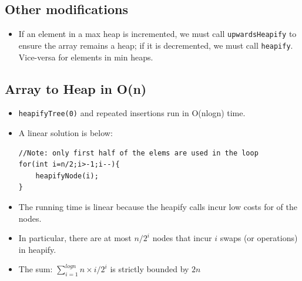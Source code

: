 \documentclass{report}
\begin{document}
\subsection{Other modifications}
\begin{itemize}
\item If an element in a max heap is incremented, we must call \texttt{upwardsHeapify} to ensure the array remains a heap; if it is decremented, we must call \texttt{heapify}. Vice-versa for elements in min heaps. 
\end{itemize}
\subsection{Array to Heap in O(n)}
\begin{itemize}
\item \texttt{heapifyTree(0)} and repeated insertions run in O(nlogn) time.
\item A linear solution is below:
\begin{lstlisting}
//Note: only first half of the elems are used in the loop
for(int i=n/2;i>-1;i--){
    heapifyNode(i);
}
\end{lstlisting}
\item The running time is linear because the heapify calls incur low costs for of the nodes.
\item In particular, there are at most $n/2^i$ nodes that incur $i$ swaps (or operations) in heapify.
\item The sum: $\sum_{i=1}^{logn}{n\times i/2^i}$ is strictly bounded by $2n$
\end{itemize}
\end{document}
